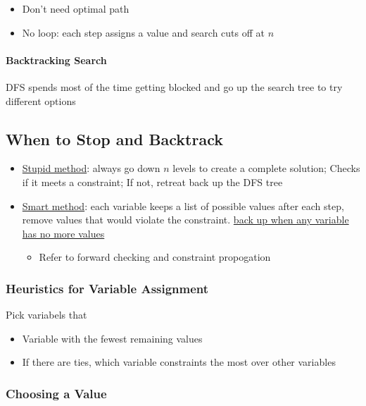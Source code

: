     \begin{itemize}
      \item Don't need optimal path
      \item No loop: each step assigns a value and search cuts off at $ n $
    \end{itemize}

    \paragraph{Backtracking Search} DFS spends most of the time getting blocked
    and go up the search tree to try different options

    \subsection{When to Stop and Backtrack}

      \begin{itemize}
        \item \ul{Stupid method}: always go down $ n $ levels to create
        a complete solution; Checks if it meets a constraint; If not,
        retreat back up the DFS tree
        \item \ul{Smart method}: each variable keeps a list of possible values
        after each step, remove values that would violate the constraint.
        \ul{back up when any variable has no more values}
        \begin{itemize}
          \item Refer to forward checking and constraint propogation
        \end{itemize}
      \end{itemize}

    \subsubsection{Heuristics for Variable Assignment}

      Pick variabels that
      \begin{itemize}
        \item Variable with the fewest remaining values
        \item If there are ties, which variable constraints the most over
        other variables
      \end{itemize}

    \subsubsection{Choosing a Value}

